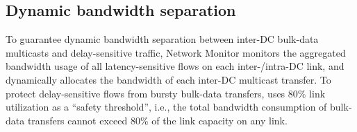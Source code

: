 \subsection{Dynamic bandwidth separation}
\label{subsec:system:separation}


To guarantee dynamic bandwidth separation between inter-DC 
bulk-data multicasts and delay-sensitive traffic, \name Network
Monitor monitors the aggregated bandwidth usage of all 
latency-sensitive flows on each inter-/intra-DC link, and 
dynamically allocates the bandwidth of each inter-DC multicast 
transfer. 
To protect delay-sensitive flows from bursty bulk-data transfers,
\company uses 80\% link utilization as a ``safety threshold'',
i.e., the total bandwidth consumption of bulk-data transfers 
cannot exceed 80\% of the link capacity on any link.
 



